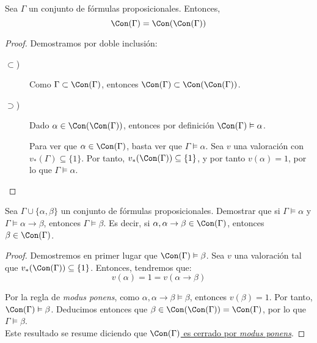 \begin{prop}
    Sea $\Gamma$ un conjunto de fórmulas proposicionales. Entonces,
    \begin{equation*}
        \Con(\Gamma)=\Con(\Con(\Gamma))
    \end{equation*}
    \begin{proof}
        Demostramos por doble inclusión:
        \begin{description}
            \item[$\subset$)] Como $\Gamma\subset \Con(\Gamma)$, entonces $\Con(\Gamma)\subset \Con(\Con(\Gamma))$.
            
            \item[$\supset$)] Dado $\alpha\in \Con(\Con(\Gamma))$, entonces por definición $\Con(\Gamma)\vDash\alpha$.
            
            Para ver que $\alpha\in \Con(\Gamma)$, basta ver que $\Gamma\vDash\alpha$. Sea $v$ una valoración con $v_\ast(\Gamma)\subseteq \{1\}$.
            Por tanto, $v_\ast(\Con(\Gamma))\subseteq \{1\}$, y por tanto $v(\alpha)=1$, por lo que $\Gamma\vDash\alpha$.
        \end{description}
    \end{proof}
\end{prop}


\begin{ejercicio}
    Sea $\Gamma \cup \{\alpha,\beta\}$ un conjunto de fórmulas proposicionales.
    Demostrar que si $\Gamma \vDash \alpha$ y $\Gamma \vDash \alpha\rightarrow \beta$, entonces $\Gamma \vDash \beta$.
    Es decir, si $\alpha,\alpha\to \beta \in \Con(\Gamma)$, entonces $\beta\in \Con(\Gamma)$.
    \begin{proof}
        Demostremos en primer lugar que $\Con(\Gamma)\vDash \beta$.
        Sea $v$ una valoración tal que $v_\ast(\Con(\Gamma))\subseteq \{1\}$. Entonces, tendremos que:
        \begin{equation*}
            v(\alpha)=1=v(\alpha\rightarrow\beta)
        \end{equation*}
        
        Por la regla de \emph{modus ponens}, como $\alpha,\alpha\rightarrow\beta\vDash \beta$, entonces $v(\beta)=1$.
        Por tanto, $\Con(\Gamma)\vDash \beta$.
        Deducimos entonces que $\beta \in \Con(\Con(\Gamma)) = \Con(\Gamma)$, por lo que $\Gamma \vDash \beta$.\\

        Este resultado se resume diciendo que \ul{$\Con(\Gamma)$ es cerrado por \emph{modus ponens}}.
    \end{proof}
\end{ejercicio}

